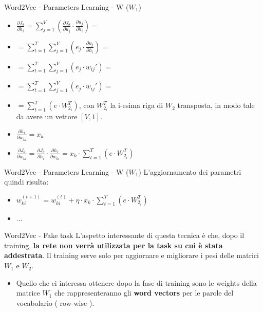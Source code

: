 \documentclass[british]{beamer}
\begin{document}
\begin{frame}{Word2Vec - Parameters Learning - W (\(W_1\))}
	\begin{itemize}
		\item \( \frac{\partial J_{\theta}}{\partial h_i} = \sum_{j=1}^{V} \left(\frac{\partial J_{\theta}}{\partial u_j} \cdot \frac{\partial u_j}{\partial h_i}\right) = \)
		\item \( = \sum_{t=1}^{T} \sum_{j=1}^{V} \left(e_j \cdot \frac{\partial u_j}{\partial h_i}\right) = \)
		\item \( = \sum_{t=1}^{T} \sum_{j=1}^{V} \left(e_j \cdot w_{ij}'\right) = \)
		\item \( = \sum_{t=1}^{T} \sum_{j=1}^{V} \left(e_j \cdot w_{ij}'\right) =\)
		\item \( = \sum_{t=1}^{T} \left(e \cdot W_{2_{i}}^T\right)\), con \(W_{2_{i}}^T\) la i-esima riga di \(W_2\) transposta, in modo tale da avere un vettore \([V,1]\).
		\item \(\frac{\partial h_i}{\partial w_{ki}} = x_k\)
		\item \(\frac{\partial J_{\theta}}{\partial w_{ki}} = \frac{\partial J_{\theta}}{\partial h_i} \cdot \frac{\partial h_i}{\partial w_{ki}} = x_k \cdot \sum_{t=1}^{T} \left(e \cdot W_{2_{i}}^T\right)\)
	\end{itemize}
\end{frame}

\begin{frame}{Word2Vec - Parameters Learning - W (\(W_1\))}
	L'aggiornamento dei parametri quindi risulta:
	\begin{itemize}
		\item \( w_{ki}^{(t+1)} = w_{ki}^{(t)} + \eta\cdot x_k \cdot \sum_{t=1}^{T} \left(e \cdot W_{2_{i}}^T\right)\)
		\item ...
	\end{itemize}
\end{frame}

\begin{frame}{Word2Vec - Fake task}
	L'aspetto interessante di questa tecnica \`{e} che, dopo il training, \textbf{la rete non verr\`{a} utilizzata per la task su cui \`{e} stata addestrata}. Il training serve solo per aggiornare e migliorare i pesi delle matrici \(W_1\) e \(W_2\).
	\begin{itemize}
		\item Quello che ci interessa ottenere dopo la fase di training sono le weights della matrice \(W_1\) che rappresenteranno gli \textbf{word vectors} per le parole del vocabolario ( row-wise ).
	\end{itemize}
\end{frame}
\end{document}
